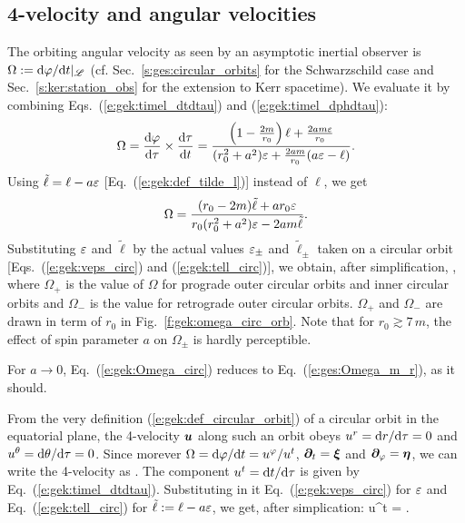 \subsection{4-velocity and angular velocities} \label{s:gek:circ_velocities}

The orbiting angular velocity as seen by an asymptotic inertial observer is
$\Omega := \mathrm{d}\varphi/\mathrm{d} t |_{\mathscr{L}}$ (cf. Sec.~\ref{s:ges:circular_orbits} for the
Schwarzschild case and Sec.~\ref{s:ker:station_obs} for the extension to Kerr
spacetime).
We evaluate it by combining Eqs.~(\ref{e:gek:timel_dtdtau}) and (\ref{e:gek:timel_dphdtau}):
\[
    \Omega = \frac{\mathrm{d}\varphi}{\mathrm{d}\tau} \times \frac{\mathrm{d}\tau}{\mathrm{d} t}
        = \frac{ \left( 1 - \frac{2m}{r_0} \right) \ell
    + \frac{2 am \varepsilon}{r_0} }{(r_0^2 + a^2) \varepsilon + \frac{2 a m}{r_0} (a\varepsilon - \ell)} .
\]
Using $\tilde{\ell} = \ell - a\varepsilon$ [Eq.~(\ref{e:gek:def_tilde_l})] instead of $\ell$, we
get
\[
    \Omega = \frac{(r_0 - 2m) \tilde{\ell} + a r_0 \varepsilon}{r_0(r_0^2 + a^2) \varepsilon
    - 2 a m \tilde{\ell}} .
\]
Substituting $\varepsilon$ and $\tilde{\ell}$ by the actual values $\varepsilon_\pm$
and $\tilde{\ell}_\pm$ taken on a circular orbit [Eqs.~(\ref{e:gek:veps_circ})
and (\ref{e:gek:tell_circ})], we obtain, after simplification,
\be \label{e:gek:Omega_circ}
     ,
\ee
where $\Omega_+$ is the value of $\Omega$ for prograde outer circular orbits
and inner circular orbits and $\Omega_-$ is the value for retrograde
outer circular orbits. $\Omega_+$ and $\Omega_-$ are drawn in term of $r_0$
in Fig.~\ref{f:gek:omega_circ_orb}. Note that for $r_0 \gtrsim 7\, m$,
the effect of spin parameter $a$ on $\Omega_\pm$ is hardly perceptible.

\begin{remark}
For $a\to 0$, Eq.~(\ref{e:gek:Omega_circ}) reduces to Eq.~(\ref{e:ges:Omega_m_r}), as it should.
\end{remark}

From the very definition (\ref{e:gek:def_circular_orbit}) of a circular orbit
in the equatorial plane, the 4-velocity $\bm{u}$ along such an orbit
obeys $u^r = \mathrm{d} r/\mathrm{d}\tau = 0$ and $u^\theta = \mathrm{d}\theta/\mathrm{d}\tau = 0$. Since morever
$\Omega = \mathrm{d}\varphi/\mathrm{d} t = u^\varphi / u^t$, $\bm{\partial}_t = \bm{\xi}$ and $\bm{\partial}_\varphi = \bm{\eta}$,
we can write the 4-velocity as
\be \label{e:gek:4vel_circ_orb}
     .
\ee
The component $u^t = \mathrm{d} t / \mathrm{d}\tau$ is given by Eq.~(\ref{e:gek:timel_dtdtau}).
Substituting in it Eq.~(\ref{e:gek:veps_circ}) for $\varepsilon$
and Eq.~(\ref{e:gek:tell_circ}) for $\tilde{\ell} := \ell - a \varepsilon$, we
get, after simplication:
\be \label{e:gek:ut_circ_orb}
    u^t =  .
\ee

